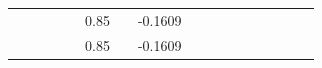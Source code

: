 \documentclass[a4paper,12pt]{article}
\begin{document}
\begin{landscape}
\begin{table}[]
\begin{tabular}{|c|c|c|c|c|c|c|c|c|c|c|c|c|c|c|c|c|}
                     &                           &                         &                         &                        & 0.85 &                          & -0.1609 &                          &                          &                           &                           &                        &                           &                                        &                           &                           \\ \cline{6-6} \cline{8-8}
                     &                           &                         &                         &                        & 0.85 &                          & -0.1609 &                          &                          &                           &                           &                        &                           &                                        &                           &                           \\ \hline
\end{tabular}
\end{table}


\end{landscape}
\end{document}
